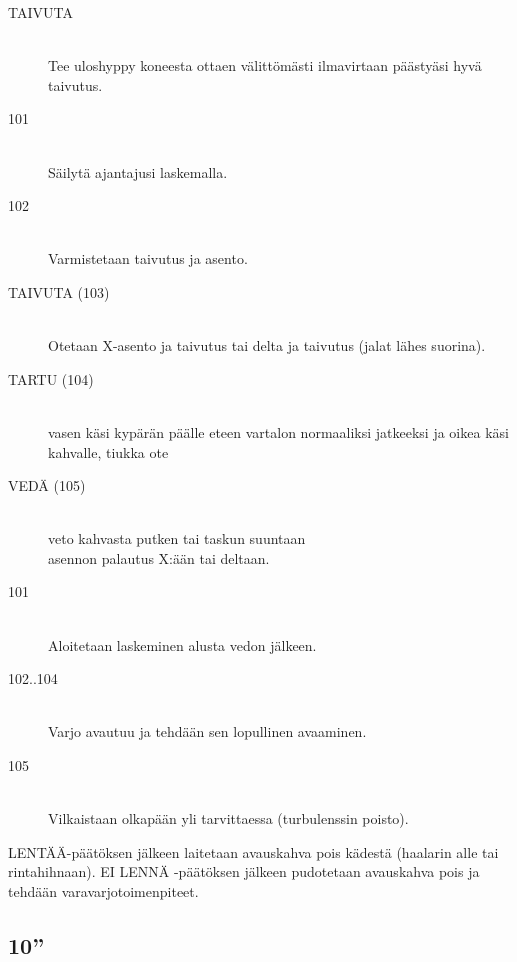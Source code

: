 \begin{multicols}{2}
\begin{description}
\item[TAIVUTA] \hfill \\ 
Tee uloshyppy koneesta ottaen välittömästi ilmavirtaan päästyäsi hyvä taivutus. \hfill \\ 
\item[101] \hfill \\ 
 Säilytä ajantajusi laskemalla.  \hfill \\ 
\item[102 ] \hfill \\ 
Varmistetaan taivutus ja asento. \hfill \\ 
\item[TAIVUTA (103)] \hfill \\ 
Otetaan X-asento ja taivutus tai delta ja taivutus (jalat lähes suorina). \hfill \\ 
\item[TARTU (104)] \hfill \\ 
vasen käsi kypärän päälle eteen vartalon normaaliksi jatkeeksi ja oikea käsi kahvalle, tiukka ote \hfill \\ 
\item[VEDÄ (105)] \hfill \\ 
veto kahvasta putken tai taskun suuntaan \hfill \\ 
asennon palautus X:ään tai deltaan. \hfill \\ 
\item[101 ] \hfill \\ 
Aloitetaan laskeminen alusta vedon jälkeen. \hfill \\ 
\item[102..104 ] \hfill \\ 
Varjo avautuu ja tehdään sen lopullinen avaaminen. \hfill \\ 
\item[105 ] \hfill \\ 
Vilkaistaan olkapään yli tarvittaessa (turbulenssin poisto). \hfill \\ 
\end{description}

LENTÄÄ-päätöksen jälkeen laitetaan avauskahva pois kädestä (haalarin alle tai rintahihnaan). EI LENNÄ -päätöksen jälkeen pudotetaan avauskahva pois ja tehdään varavarjotoimenpiteet. 


\end{multicols}\pagebreak\begin{multicols}{2} 

\section{ 10'' }
\label{pl-alkeiskoulutuksen-suoritukset-10}



\end{multicols}

